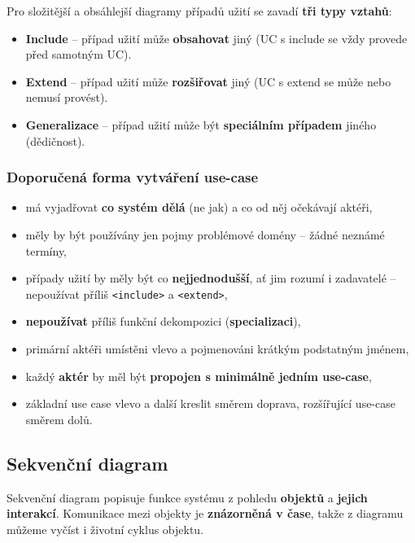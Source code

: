 \noindent Pro složitější a obsáhlejší diagramy případů užití se zavadí \textbf{tři typy vztahů}:
\begin{itemize}
\item \textbf{Include} – případ užití může \textbf{obsahovat} jiný (UC s include se vždy provede před samotným UC).
\item \textbf{Extend} – případ užití může \textbf{rozšiřovat} jiný (UC s extend se může nebo nemusí provést).
\item \textbf{Generalizace} – případ užití může být \textbf{speciálním případem} jiného (dědičnost).
\end{itemize}

\subsubsection{Doporučená forma vytváření use-case}
\begin{itemize}
\item má vyjadřovat \textbf{co systém dělá} (ne jak) a co od něj očekávají aktéři,
\item měly by být používány jen pojmy problémové domény -- žádné neznámé termíny,
\item případy užití by měly být co \textbf{nejjednodušší}, ať jim rozumí i zadavatelé -- nepoužívat příliš \texttt{<include>} a \texttt{<extend>},
\item \textbf{nepoužívat} příliš funkční dekompozici (\textbf{specializaci}),
\item primární aktéři umístěni vlevo a pojmenováni krátkým podstatným jménem,
\item každý \textbf{aktér} by měl být \textbf{propojen s minimálně jedním use-case},
\item základní use case vlevo a další kreslit směrem doprava, rozšířující use-case směrem dolů.
\end{itemize}

\subsection{Sekvenční diagram}
Sekvenční diagram popisuje funkce systému z pohledu \textbf{objektů} a\textbf{ jejich interakcí}. Komunikace mezi objekty je \textbf{znázorněná v čase}, takže z diagramu můžeme vyčíst i životní cyklus objektu. 

